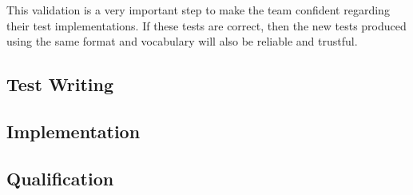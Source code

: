This validation is a very important step to make the team confident regarding
their test implementations.
If these tests are correct, then the new tests produced using the same format
and vocabulary will also be reliable and trustful.

\subsection{Test Writing}\label{subsec:test-writing}

\subsection{Implementation}\label{subsec:implementation}

\subsection{Qualification}\label{subsec:qualification}

